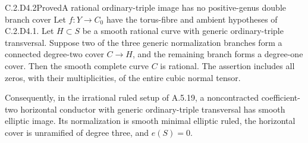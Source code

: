 \begin{statement}{C.2.D4.2}{Proved}{A rational ordinary-triple image has no positive-genus double branch cover}
Let $f:Y\to C_0$ have the torus-fibre and ambient hypotheses
of C.2.D4.1. Let $H\subset S$ be a smooth rational curve
with generic ordinary-triple transversal. Suppose two of
the three generic normalization branches form a connected
degree-two cover $C\to H$, and the remaining branch forms
a degree-one cover. Then the smooth complete curve $C$
is rational. The assertion includes all zeros, with their
multiplicities, of the entire cubic normal tensor.

Consequently, in the irrational ruled setup of A.5.19,
a noncontracted coefficient-two horizontal conductor
with generic ordinary-triple transversal has smooth
elliptic image. Its normalization is smooth minimal
elliptic ruled, the horizontal cover is unramified of
degree three, and $e(S)=0$.
\end{statement}

